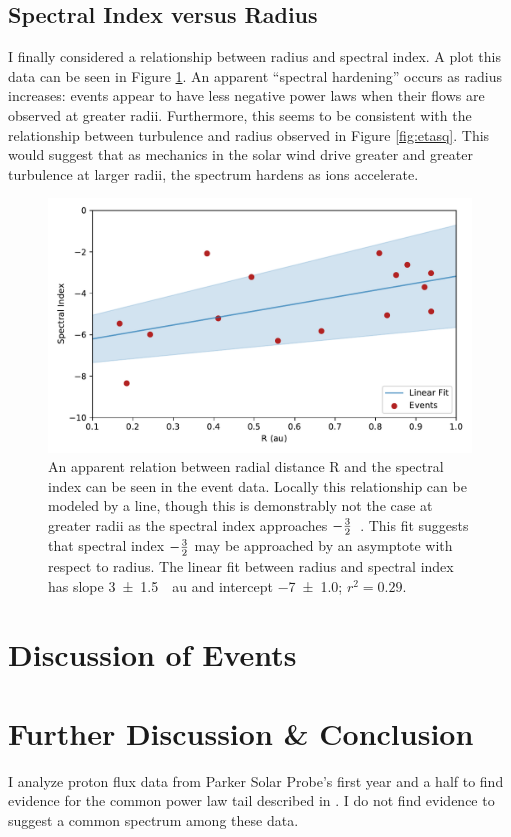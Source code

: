 \documentclass[letterpaper,11pt]{article}
\begin{document}
\subsection{Spectral Index versus Radius}
I finally considered a relationship between radius and spectral index.  A plot this data can be seen in Figure \ref{fig:specidx_vs_R}.  An apparent ``spectral hardening'' occurs as radius increases: events appear to have less negative power laws when their flows are observed at greater radii.  Furthermore, this seems to be consistent with the relationship between turbulence and radius observed in Figure \ref{fig:etasq}.  This would suggest that as mechanics in the solar wind drive greater and greater turbulence at larger radii, the spectrum hardens as ions accelerate.

\begin{figure}[htbp]
\centering
\includegraphics[width=0.9\linewidth]{figures/specidx_vs_R.pdf}
\caption{An apparent relation between radial distance R and the spectral index can be seen in the event data.  Locally this relationship can be modeled by a line, though this is demonstrably not the case at greater radii as the spectral index approaches $-{3 \over 2}$~\citep{Fisk2008,Fisk2006,Schwadron2010,Schwadron2019AGU}.  This fit suggests that spectral index $-{3 \over 2}$ may be approached by an asymptote with respect to radius.  The linear fit between radius and spectral index has slope \SI{3 \pm 1.5}{\per \astronomicalunit} and intercept \SI{-7 \pm 1.0}{}; $r^2 = 0.29$.}
\label{fig:specidx_vs_R}
\end{figure}

\section{Discussion of Events}


\section{Further Discussion \& Conclusion}
\label{sec:conclusion}
I analyze proton flux data from Parker Solar Probe's first year and a half to find evidence for the common power law tail described in \citet{Fisk2006}.  I do not find evidence to suggest a common spectrum among these data.
\end{document}
